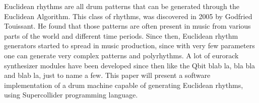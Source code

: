 \documentclass[main.tex]{subfiles}
\begin{document}
Euclidean rhythms are all drum patterns that can be generated through the Euclidean Algorithm. This class of rhythms, was discovered in 2005 by Godfried Touissant\cite{Toussaint:2004:euclidean:rhythm}. He found that those patterns are often present in music from various parts of the world and different time periods. Since then, Euclidean rhythm generators started to spread in music production, since with very few parameters one can generate very complex patterns and polyrhythms. A lot of eurorack synthesizer modules have been developed since then like the Qbit blab la, bla bla and blab la, just to name a few. This paper will present a software implementation of a drum machine capable of generating Euclidean rhythms, using Supercollider programming language.
\end{document}
